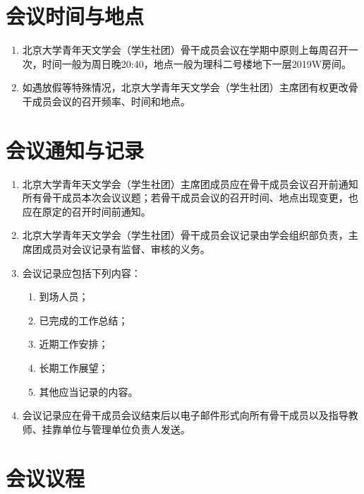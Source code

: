 \section{会议时间与地点}

\begin{enumerate}[resume]
    \item 北京大学青年天文学会（学生社团）骨干成员会议在学期中原则上每周召开一次，时间一般为周日晚20:40，地点一般为理科二号楼地下一层2019W房间。
    
    \item 如遇放假等特殊情况，北京大学青年天文学会（学生社团）主席团有权更改骨干成员会议的召开频率、时间和地点。
\end{enumerate}

\section{会议通知与记录}

\begin{enumerate}[resume]
    \item 北京大学青年天文学会（学生社团）主席团成员应在骨干成员会议召开前通知所有骨干成员本次会议议题；若骨干成员会议的召开时间、地点出现变更，也应在原定的召开时间前通知。
    
    \item 北京大学青年天文学会（学生社团）骨干成员会议记录由学会组织部负责，主席团成员对会议记录有监督、审核的义务。
    
    \item 会议记录应包括下列内容：
    \begin{enumerate}
        \item 到场人员；
        \item 已完成的工作总结；
        \item 近期工作安排；
        \item 长期工作展望；
        \item 其他应当记录的内容。
    \end{enumerate}
    
    \item 会议记录应在骨干成员会议结束后以电子邮件形式向所有骨干成员以及指导教师、挂靠单位与管理单位负责人发送。
\end{enumerate}

\section{会议议程}

